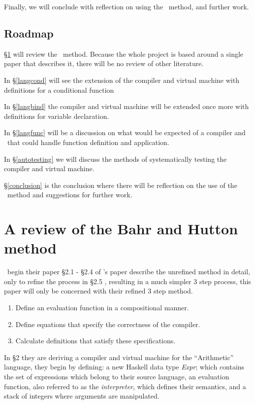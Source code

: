 \documentclass {article}
\begin{document}
Finally, we will conclude with 
reflection on using the \BH\ method,
and further work.

\subsection{Roadmap}

\S\ref{bhrev} will review the \BH\ method.
Because the whole project is based around a single
paper that describes it, there will be no review
of other literature.

In \S\ref{langcond} will see the extension of the compiler and
virtual machine with definitions for a conditional function

In \S\ref{langbind} the compiler and
virtual machine will be extended
 once more with definitions for variable declaration.
 
In \S\ref{langfunc} will be a discussion on what
would be expected of a compiler and \vm\ that
could handle function definition and application.

In \S\ref{autotesting} we will discuss the methods
of systematically testing the compiler and virtual machine.

\S\ref{conclusion} is the conclusion where there will
be reflection on the use of the \BH\ method and suggestions
for further work.

\pagebreak
\section{A review of the Bahr and Hutton method} \label{bhrev}

\BH\ begin their paper \S2.1 - \S2.4 of \BH's paper describe the unrefined 
method in detail, only to refine the process
in \S2.5 \cite[Combining the transformation steps]{bandh},
resulting in a much simpler 3 step process, 
this paper will only be concerned with
their refined 3 step method\cite[page 12]{bandh}.

\begin{enumerate}
	\item Define an evaluation function
		in a compositional manner.
	\item Define equations that specify
		the correctness of the compiler.
	\item Calculate definitions that 
		satisfy these specifications.
\end{enumerate}
\newcommand{\expr}{\textit{Expr}}

In \S2 they are deriving a compiler
and virtual machine for the ``Arithmetic'' language,
they begin by defining: a new Haskell data type \expr;
which contains the set of expressions which belong to their source language,
an evaluation function, also referred to as the \emph{interpreter},
which defines their semantics,
and a stack of integers where 
arguments are manipulated.
\newcommand{\eval}{\textit{eval}}
\newcommand{\val}{\textit{Val}}
\newcommand{\add}{\textit{Add}}
\newcommand{\code}{\textit{Code}}
\newcommand{\Val}{\mathit{Val\ }}
\newcommand{\Add}{\mathit{Add\ }}
\newcommand{\evalf}{\mathit{eval\ }}
\newcommand{\Expr}{\mathit{Expr\ }}
\newcommand{\Int}{\mathit{Int\ }}
\newcommand{\Code}{\mathit{Code\ }}
\end{document}
